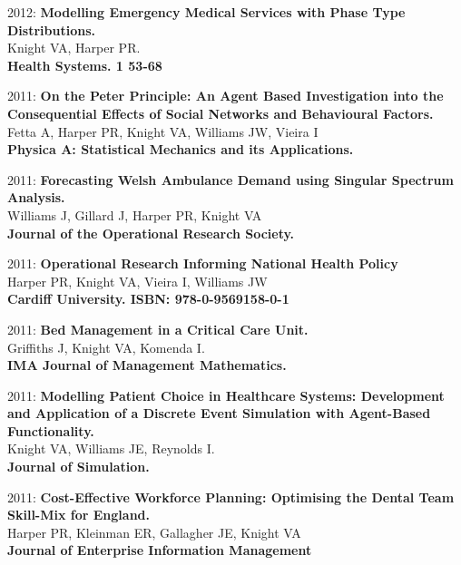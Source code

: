 \documentclass[10pt]{res} %
\begin{document}
\begin{resume}
\begin{etaremune}
\item
2012: \textbf{Modelling Emergency Medical Services with Phase Type Distributions.}\\
Knight VA, Harper PR.
\\
\textbf{Health Systems. 1 53-68}
\\

\item
2011: \textbf{On the Peter Principle: An Agent Based Investigation into the Consequential Effects of Social Networks and Behavioural Factors.}\\
Fetta A, Harper PR, Knight VA, Williams JW, Vieira I
\\
\textbf{Physica A: Statistical Mechanics and its Applications.}
\\

\item
2011: \textbf{Forecasting Welsh Ambulance Demand using Singular Spectrum Analysis.}\\
Williams J, Gillard J, Harper PR, Knight VA
\\
\textbf{Journal of the Operational Research Society.}
\\

\item
2011: \textbf{Operational Research Informing National Health Policy}\\
Harper PR, Knight VA, Vieira I, Williams JW
\\
\textbf{Cardiff University. ISBN: 978-0-9569158-0-1}
\\

\item
2011: \textbf{Bed Management in a Critical Care Unit.}\\
Griffiths J, Knight VA, Komenda I.
\\
\textbf{IMA Journal of Management Mathematics.}
\\

\item
2011: \textbf{Modelling Patient Choice in Healthcare Systems: Development and Application of a Discrete Event Simulation with Agent-Based Functionality.}\\
Knight VA, Williams JE, Reynolds I.
\\
\textbf{Journal of Simulation.}
\\

\item
2011: \textbf{Cost-Effective Workforce Planning: Optimising the Dental Team Skill-Mix for England.}\\
Harper PR, Kleinman ER, Gallagher JE, Knight VA
\\
\textbf{Journal of Enterprise Information Management}
\\


\end{etaremune}
\end{resume}
\end{document}
